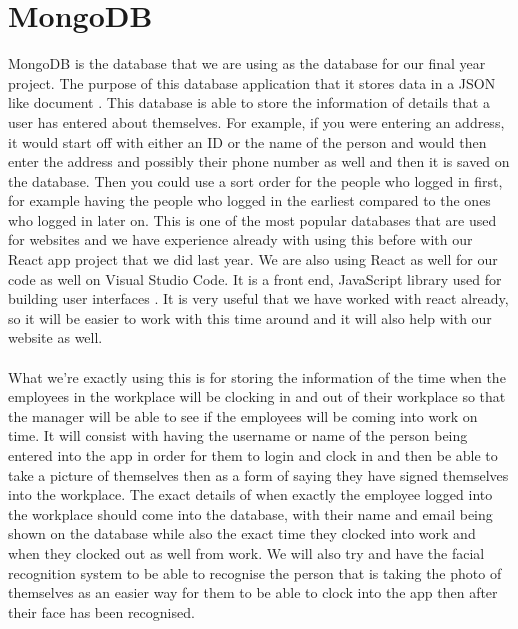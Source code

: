 \section{MongoDB}
MongoDB is the database that we are using as the database for our final year project. The purpose of this database application that it stores data in a JSON like document \cite{MongoDBAtlas}. This database is able to store the information of details that a user has entered about themselves. For example, if you were entering an address, it would start off with either an ID or the name of the person and would then enter the address and possibly their phone number as well and then it is saved on the database. Then you could use a sort order for the people who logged in first, for example having the people who logged in the earliest compared to the ones who logged in later on. This is one of the most popular databases that are used for websites and we have experience already with using this before with our React app project that we did last year. We are also using React as well for our code as well on Visual Studio Code. It is a front end, JavaScript library used for building user interfaces \cite{react}. It is very useful that we have worked with react already, so it will be easier to work with this time around and it will also help with our website as well.
\\
\\
What we’re exactly using this is for storing the information of the time when the employees in the workplace will be clocking in and out of their workplace so that the manager will be able to see if the employees will be coming into work on time. It will consist with having the username or name of the person being entered into the app in order for them to login and clock in and then be able to take a picture of themselves then as a form of saying they have signed themselves into the workplace. The exact details of when exactly the employee logged into the workplace should come into the database, with their name and email being shown on the database while also the exact time they clocked into work and when they clocked out as well from work. We will also try and have the facial recognition system to be able to recognise the person that is taking the photo of themselves as an easier way for them to be able to clock into the app then after their face has been recognised.
\\
